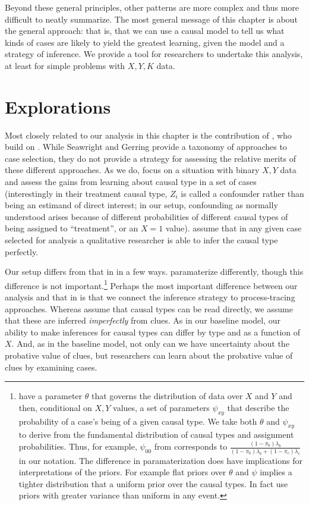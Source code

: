 \documentclass[12pt,]{book}
\let\rmarkdownfootnote\footnote%
\def\footnote{\protect\rmarkdownfootnote}
\begin{document}
Beyond these general principles, other patterns are more complex and thus more difficult to neatly summarize. The most general message of this chapter is about the general approach: that is, that we can use a causal model to tell us what kinds of cases are likely to yield the greatest learning, given the model and a strategy of inference. We provide a tool for researchers to undertake this analysis, at least for simple problems with \(X, Y, K\) data.

\hypertarget{explorations}{%
\section{Explorations}\label{explorations}}

Most closely related to our analysis in this chapter is the contribution of \citet{HerronQuinn}, who build on \citet{SeawrightGerring2008}. While Seawright and Gerring provide a taxonomy of approaches to case selection, they do not provide a strategy for assessing the relative merits of these different approaches. As we do, \citet{HerronQuinn} focus on a situation with binary \(X,Y\) data and assess the gains from learning about causal type in a set of cases (interestingly in their treatment causal type, \(Z_i\) is called a confounder rather than being an estimand of direct interest; in our setup, confounding as normally understood arises because of different probabilities of different causal types of being assigned to ``treatment'', or an \(X=1\) value). \citet{HerronQuinn} assume that in any given case selected for analysis a qualitative researcher is able to infer the causal type perfectly.

Our setup differs from that in \citet{HerronQuinn} in a few ways. \citet{HerronQuinn} paramaterize differently, though this difference is not important.\footnote{\citet{HerronQuinn} have a parameter \(\theta\) that governs the distribution of data over \(X\) and \(Y\) and then, conditional on \(X,Y\) values, a set of parameters \(\psi_{xy}\) that describe the probability of a case's being of a given causal type. We take both \(\theta\) and \(\psi_{xy}\) to derive from the fundamental distribution of causal types and assignment probabilities. Thus, for example, \(\psi_{00}\) from \citet{HerronQuinn} corresponds to \(\frac{(1-\pi_b)\lambda_b}{(1-\pi_b)\lambda_b + (1-\pi_c)\lambda_c}\) in our notation. The difference in paramaterization does have implications for interpretations of the priors. For example flat priors over \(\theta\) and \(\psi\) implies a tighter distribution that a uniform prior over the causal types. In fact \citet{HerronQuinn} use priors with greater variance than uniform in any event.} Perhaps the most important difference between our analysis and that in \citet{HerronQuinn} is that we connect the inference strategy to process-tracing approaches. Whereas \citet{HerronQuinn} assume that causal types can be read directly, we assume that these are inferred \emph{imperfectly} from clues. As in our baseline model, our ability to make inferences for causal types can differ by type and as a function of \(X\). And, as in the baseline model, not only can we have uncertainty about the probative value of clues, but researchers can learn about the probative value of clues by examining cases.
\end{document}
